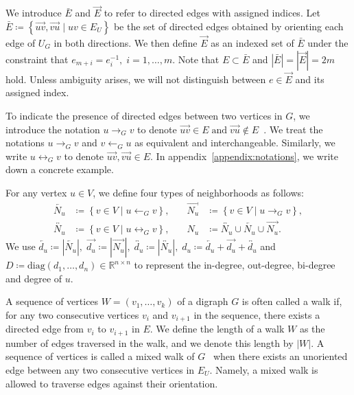\documentclass{article}
\theoremstyle{plain}
\begin{document}
We introduce $\bar{E}$ and $\vec{E}$ to refer to directed edges with assigned indices.
Let $\bar{E} \coloneqq \left\{ \overrightarrow{uv}, \overrightarrow{vu} \mid uv \in E_U \right\}$ be the set of directed edges obtained by orienting each edge of $U_G$ in both directions.
We then define $\vec{E}$ as an indexed set of $\bar{E}$ under the constraint that $e_{m+i} = e_{i}^{-1},\; i=1,\dots,m$.
Note that $E \subset \bar{E}$ and $| \bar{E} | = | \vec{E} | = 2m$ hold.
Unless ambiguity arises, we will not distinguish between $e \in \vec{E}$ and its assigned index.

To indicate the presence of directed edges between two vertices in $G$,
we introduce the notation $u \rightarrow_{G} v$ to denote $\overrightarrow{uv} \in E \;\text{and}\; \overrightarrow{vu} \not\in E$~\citep{Liu2015-qu}.
We treat the notations $u \rightarrow_{G} v$ and $v \leftarrow_{G} u$ as equivalent and interchangeable.
Similarly, we write $u\leftrightarrow_{G} v$ to denote $\overrightarrow{uv}, \overrightarrow{vu} \in E$.
In appendix~\ref{appendix:notations}, we write down a concrete example.

For any vertex $u \in V$, we define four types of neighborhoods as follows:
\begin{align*}
	\overleftarrow{N_u}      & \coloneqq \left\{ v \in V \mid u \leftarrow_{G} v \right\}
	,                        & \quad
	\overrightarrow{N_u}     & \coloneqq \left\{ v \in V \mid u\rightarrow_{G} v \right\}
	,                                                                                                                \\
	\overleftrightarrow{N_u} & \coloneqq \left\{ v \in V \mid u\leftrightarrow_{G} v \right\}
	,                        & \quad
	N_u                      & \coloneqq \overleftrightarrow{N_u} \cup \overleftarrow{N_u} \cup \overrightarrow{N_u}
	.
\end{align*}
We use $\overleftarrow{d_u} \coloneqq | \overleftarrow{N_u} |,\; \overrightarrow{d_u} \coloneqq | \overrightarrow{N_u} |,\; \overleftrightarrow{d_u} \coloneqq | \overleftrightarrow{N_u} |,\; d_u \coloneqq \overleftarrow{d_u} + \overrightarrow{d_u} + \overleftrightarrow{d_u}$ and $D \coloneqq \text{diag}(d_1,\dots, d_n) \in \mathbb{R}^{n\times n}$ to represent the in-degree, out-degree, bi-degree and degree of $u$.

A sequence of vertices $W = (v_1,\dots, v_k)$ of a digraph $G$ is often called a walk if,
for any two consecutive vertices $v_i$ and $v_{i+1}$ in the sequence,
there exists a directed edge from $v_i$ to $v_{i+1}$ in $E$.
We define the length of a walk $W$ as the number of edges traversed in the walk, and we denote this length by $|W|$.
A sequence of vertices is called a mixed walk of $G$~\citep{Liu2015-qu} when there exists an unoriented edge between any two consecutive vertices in $E_U$.
Namely, a mixed walk is allowed to traverse edges against their orientation.
\end{document}
